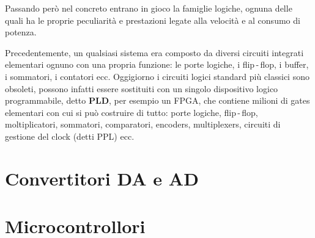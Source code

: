 \documentclass[12pt, a4paper]{report}
\begin{document}
Passando però nel concreto entrano in gioco la famiglie logiche, ognuna delle quali ha le proprie peculiarità e prestazioni legate alla velocità e al consumo di potenza.

Precedentemente, un qualsiasi sistema era composto da diversi circuiti integrati elementari ognuno con una propria funzione: le porte logiche, i flip\,-\,flop, i buffer, i sommatori, i contatori ecc. Oggigiorno i circuiti logici standard più classici sono obsoleti, possono infatti essere sostituiti con un singolo dispositivo logico programmabile, detto \textbf{PLD}, per esempio un FPGA, che contiene milioni di gates elementari con cui si può costruire di tutto: porte logiche, flip\,-\,flop, moltiplicatori, sommatori, comparatori, encoders, multiplexers, circuiti di gestione del clock (detti PPL) ecc.



\chapter{Convertitori DA e AD}
\chapter{Microcontrollori}
\end{document}
